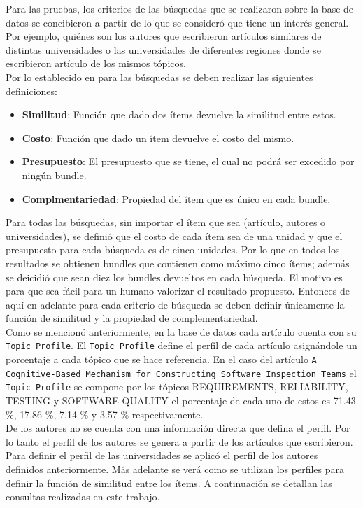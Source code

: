 Para las pruebas, los criterios de las búsquedas que se realizaron sobre la base de datos se concibieron a partir de lo que se consideró que tiene un interés general. Por ejemplo, quiénes son los autores que escribieron artículos similares de distintas universidades o las universidades de diferentes regiones donde se escribieron artículo de los mismos tópicos.\\
Por lo establecido en \cite{compositeRetrival} para las búsquedas se deben realizar las siguientes definiciones:
\begin{itemize}
  \item \textbf{Similitud}: Función que dado dos ítems devuelve la similitud entre estos.
  \item \textbf{Costo}: Función que dado un ítem devuelve el costo del mismo.
  \item \textbf{Presupuesto}: El presupuesto que se tiene, el cual no podrá ser excedido por ningún bundle.
  \item \textbf{Complmentariedad}: Propiedad del ítem que es único en cada bundle.
\end{itemize}
Para todas las búsquedas, sin importar el ítem que sea (artículo, autores o universidades),  se definió que el costo de cada ítem sea de una unidad y que el presupuesto para cada búsqueda es de cinco unidades. Por lo que en todos los resultados se obtienen bundles que contienen como máximo cinco ítems; además se deicidió que sean diez los bundles devueltos en cada búsqueda. El motivo es para que sea fácil para un humano valorizar el resultado propuesto. Entonces de aquí en adelante para cada criterio de búsqueda se deben definir únicamente la función de similitud y la propiedad de complementariedad.\\
Como se mencionó anteriormente, en la base de datos cada artículo cuenta con su \texttt{Topic Profile}. El \texttt{Topic Profile} define el perfil de cada artículo asignándole un porcentaje a cada tópico que se hace referencia. En el caso del artículo \texttt{A Cognitive-Based Mechanism for Constructing Software Inspection Teams} el \texttt{Topic Profile} se compone por los tópicos  REQUIREMENTS, RELIABILITY, TESTING y SOFTWARE QUALITY el porcentaje de cada uno de estos es 71.43 \%, 17.86 \%, 7.14 \% y 3.57 \% respectivamente. \\
De los autores no se cuenta con una información directa que defina el perfil. Por lo tanto el perfil de los autores se genera a partir de los artículos que escribieron. Para definir el perfil de las universidades se aplicó el perfil de los autores definidos anteriormente. Más adelante se verá como se utilizan los perfiles para definir la función de similitud entre los ítems. A continuación se detallan las consultas realizadas en este trabajo.\\
